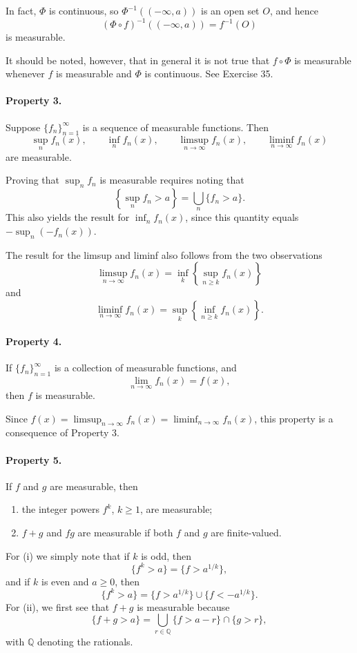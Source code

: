 \documentclass[11pt,openany]{book}
\begin{document}
In fact, $\Phi$ is continuous, so $\Phi^{-1}(( -\infty,a))$ is an open set $O$, and hence
\[
 (\Phi\circ f)^{-1}(( -\infty,a))=f^{-1}(O)
\]
is measurable.

It should be noted, however, that in general it is not true that $f\circ\Phi$ is measurable whenever $f$ is measurable and $\Phi$ is continuous. See Exercise 35.

\paragraph{Property 3.} Suppose $\{f_n\}_{n=1}^{\infty}$ is a sequence of measurable functions. Then
\[
 \sup_n f_n(x),\qquad \inf_n f_n(x),\qquad
 \limsup_{n\to\infty}f_n(x),\qquad
 \liminf_{n\to\infty}f_n(x)
\]
are measurable.

Proving that $\sup_n f_n$ is measurable requires noting that
\[
 \left\{\sup_n f_n>a\right\}=\bigcup_n\{f_n>a\}.
\]
This also yields the result for $\inf_n f_n(x)$, since this quantity equals $-\sup_n(-f_n(x))$.

The result for the limsup and liminf also follows from the two observations
\[
 \limsup_{n\to\infty}f_n(x)
 =\inf_k\left\{\sup_{n\ge k}f_n(x)\right\}
\]
and
\[
 \liminf_{n\to\infty}f_n(x)
 =\sup_k\left\{\inf_{n\ge k}f_n(x)\right\}.
\]

\paragraph{Property 4.} If $\{f_n\}_{n=1}^{\infty}$ is a collection of measurable functions, and
\[
 \lim_{n\to\infty}f_n(x)=f(x),
\]
then $f$ is measurable.

Since $f(x)=\limsup_{n\to\infty}f_n(x)=\liminf_{n\to\infty}f_n(x)$, this property is a consequence of Property 3.

\paragraph{Property 5.} If $f$ and $g$ are measurable, then
\begin{enumerate}
\item[(i)] the integer powers $f^k$, $k\ge1$, are measurable;
\item[(ii)] $f+g$ and $fg$ are measurable if both $f$ and $g$ are finite-valued.
\end{enumerate}
For (i) we simply note that if $k$ is odd, then
\[
 \{f^k>a\}=\{f>a^{1/k}\},
\]
and if $k$ is even and $a\ge0$, then
\[
 \{f^k>a\}=\{f>a^{1/k}\}\cup\{f<-a^{1/k}\}.
\]
For (ii), we first see that $f+g$ is measurable because
\[
 \{f+g>a\}
 =\bigcup_{r\in\mathbb{Q}}\{f>a-r\}\cap\{g>r\},
\]
with $\mathbb{Q}$ denoting the rationals.
\end{document}
